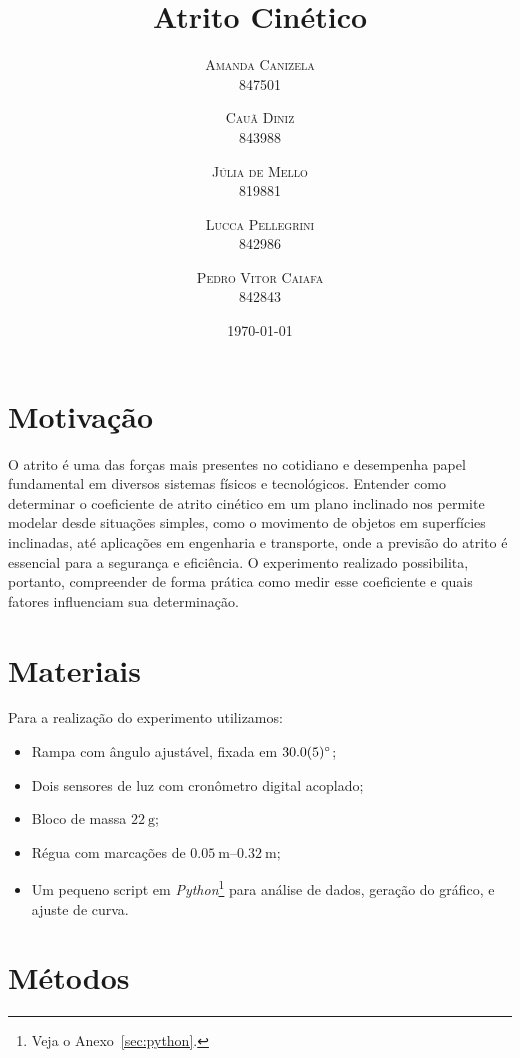 \documentclass[10pt,oneside,twocolumn,a4paper]{article} %
\title{Atrito Cinético}
\author{
        \textsc{Amanda Canizela} \\[1ex] %
        \normalsize{847501}
        \and %
        \textsc{Cauã Diniz} \\[1ex]
        \normalsize{843988}
        \and
        \textsc{Júlia de Mello} \\[1ex]
        \normalsize{819881}
        \and
        \textsc{Lucca Pellegrini} \\[1ex]
        \normalsize{842986}
        \and
        \textsc{Pedro Vitor Caiafa} \\[1ex]
        \normalsize{842843}
}
\date{\today} %
\begin{document}


\maketitle


\section{Motivação}

O atrito é uma das forças mais presentes no cotidiano e desempenha papel
fundamental em diversos sistemas físicos e tecnológicos. Entender como
determinar o coeficiente de atrito cinético em um plano inclinado nos permite
modelar desde situações simples, como o movimento de objetos em superfícies
inclinadas, até aplicações em engenharia e transporte, onde a previsão do
atrito é essencial para a segurança e eficiência. O experimento realizado
possibilita, portanto, compreender de forma prática como medir esse coeficiente
e quais fatores influenciam sua determinação.

\section{Materiais}

Para a realização do experimento utilizamos:

\begin{itemize}
    \item Rampa com ângulo ajustável, fixada em $\SI{30 \pm 0.5}{\degree}$;
    \item Dois sensores de luz com cronômetro digital acoplado;
    \item Bloco de massa $\SI{22}{\gram}$;
	\item Régua com marcações de $\SIrange{0.05}{0.32}{\metre};$
	\item Um pequeno script em \textit{Python}\footnote{Veja o
		Anexo~\ref{sec:python}.} para análise de dados, geração do gráfico, e
		ajuste de curva.
\end{itemize}

\section{Métodos}
\end{document}
